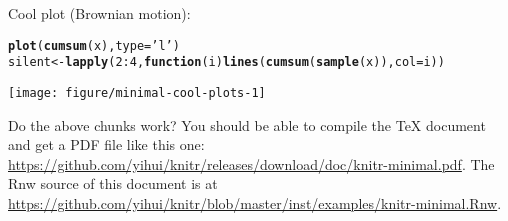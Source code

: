 \documentclass{article}\usepackage[]{graphicx}\usepackage[]{color}
\makeatletter
\newcommand{\hlnum}[1]{\textcolor[rgb]{0.686,0.059,0.569}{#1}}%
\newcommand{\hlstr}[1]{\textcolor[rgb]{0.192,0.494,0.8}{#1}}%
\newcommand{\hlopt}[1]{\textcolor[rgb]{0,0,0}{#1}}%
\newcommand{\hlstd}[1]{\textcolor[rgb]{0.345,0.345,0.345}{#1}}%
\newcommand{\hlkwa}[1]{\textcolor[rgb]{0.161,0.373,0.58}{\textbf{#1}}}%
\newcommand{\hlkwb}[1]{\textcolor[rgb]{0.69,0.353,0.396}{#1}}%
\newcommand{\hlkwc}[1]{\textcolor[rgb]{0.333,0.667,0.333}{#1}}%
\newcommand{\hlkwd}[1]{\textcolor[rgb]{0.737,0.353,0.396}{\textbf{#1}}}%
\newenvironment{kframe}{%
 \def\at@end@of@kframe{}%
 \ifinner\ifhmode%
  \def\at@end@of@kframe{\end{minipage}}%
  \begin{minipage}{\columnwidth}%
 \fi\fi%
 \def\FrameCommand##1{\hskip\@totalleftmargin \hskip-\fboxsep
 \colorbox{shadecolor}{##1}\hskip-\fboxsep
     \hskip-\linewidth \hskip-\@totalleftmargin \hskip\columnwidth}%
 \MakeFramed {\advance\hsize-\width
   \@totalleftmargin\z@ \linewidth\hsize
   \@setminipage}}%
 {\par\unskip\endMakeFramed%
 \at@end@of@kframe}
\newenvironment{knitrout}{}{} %
\makeatother
\begin{document}
Cool plot (Brownian motion):

\begin{knitrout}
\color{fgcolor}\begin{kframe}
\begin{alltt}
\hlkwd{plot}\hlstd{(}\hlkwd{cumsum}\hlstd{(x),} \hlkwc{type}\hlstd{=}\hlstr{'l'}\hlstd{)}
\hlstd{silent} \hlkwb{<-} \hlkwd{lapply}\hlstd{(}\hlnum{2}\hlopt{:}\hlnum{4}\hlstd{,} \hlkwa{function}\hlstd{(}\hlkwc{i}\hlstd{)} \hlkwd{lines}\hlstd{(}\hlkwd{cumsum}\hlstd{(}\hlkwd{sample}\hlstd{(x)),} \hlkwc{col}\hlstd{=i))}
\end{alltt}
\end{kframe}

{\centering \texttt{[image: figure/minimal-cool-plots-1]} 

}



\end{knitrout}

Do the above chunks work? You should be able to compile the \TeX{}
document and get a PDF file like this one: \url{https://github.com/yihui/knitr/releases/download/doc/knitr-minimal.pdf}.
The Rnw source of this document is at \url{https://github.com/yihui/knitr/blob/master/inst/examples/knitr-minimal.Rnw}.
\end{document}
